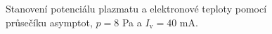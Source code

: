 \documentclass[a4paper,12pt]{article}
\begin{document}
\begin{figure}[h!]
	\centering
	\begin{subfigure}[b]{.49\textwidth}
		\centering
	\end{subfigure}
	\begin{subfigure}[b]{.49\textwidth}
		\centering
	\end{subfigure}
	\caption{Stanovení potenciálu plazmatu a elektronové teploty pomocí 
		průsečíku asymptot, $p = 8$ \si{\pascal} a $I_\text{v} = 40$ 
		\si{\milli\ampere}.}
	\label{data7}
\end{figure}
\end{document}
